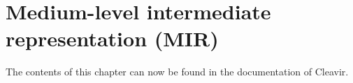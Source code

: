 \chapter{Medium-level intermediate representation (MIR)}
\label{chap-mir}

The contents of this chapter can now be found in the documentation of
Cleavir. 
